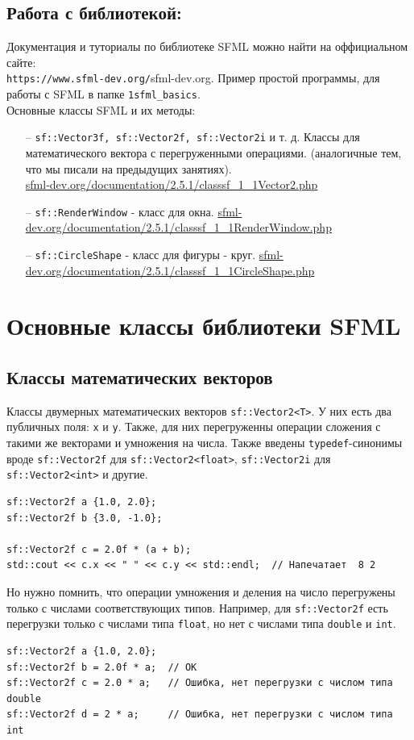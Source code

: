 \documentclass{article}
\begin{document}
\subsection*{Работа с библиотекой:}
Документация и туториалы по библиотеке SFML можно найти на оффициальном сайте:\\ \texttt{https://www.sfml-dev.org/}{sfml-dev.org}. Пример простой программы, для работы с SFML в папке \texttt{1sfml\_basics}. \\
Основные классы SFML и их методы:
\begin{itemize}
\item[--] \texttt{sf::Vector3f, sf::Vector2f, sf::Vector2i} и т. д. Классы для математического вектора с перегруженными операциями. (аналогичные тем, что мы писали на предыдущих занятиях). \\
\href{https://www.sfml-dev.org/documentation/2.5.1/classsf_1_1Vector2.php}{sfml-dev.org/documentation/2.5.1/classsf\_1\_1Vector2.php}
\item[--] \texttt{sf::RenderWindow} - класс для окна.
\href{https://www.sfml-dev.org/documentation/2.5.1/classsf_1_1RenderWindow.php}{sfml-dev.org/documentation/2.5.1/classsf\_1\_1RenderWindow.php}
\item[--] \texttt{sf::CircleShape} - класс для фигуры - круг.
\href{https://www.sfml-dev.org/documentation/2.5.1/classsf_1_1CircleShape.php}{sfml-dev.org/documentation/2.5.1/classsf\_1\_1CircleShape.php}
\end{itemize}
\fi


\newpage
\section{Основные классы библиотеки SFML}

\subsection*{Классы математических векторов}
Классы двумерных математических векторов \texttt{sf::Vector2<T>}. У них есть два публичных поля: \texttt{x} и \texttt{y}. Также, для них перегруженны операции сложения с такими же векторами и умножения на числа. Также введены \texttt{typedef}-синонимы вроде \texttt{sf::Vector2f} для \texttt{sf::Vector2<float>}, \texttt{sf::Vector2i} для \texttt{sf::Vector2<int>} и другие.
\begin{lstlisting}
sf::Vector2f a {1.0, 2.0};
sf::Vector2f b {3.0, -1.0};

sf::Vector2f c = 2.0f * (a + b);
std::cout << c.x << " " << c.y << std::endl;  // Напечатает  8 2
\end{lstlisting}
Но нужно помнить, что операции умножения и деления на число перегружены только с числами соответствующих типов. Например, для \texttt{sf::Vector2f} есть перегрузки только с числами типа \texttt{float}, но нет с числами типа \texttt{double} и \texttt{int}.
\begin{lstlisting}
sf::Vector2f a {1.0, 2.0};
sf::Vector2f b = 2.0f * a;  // ОК
sf::Vector2f c = 2.0 * a;   // Ошибка, нет перегрузки с числом типа double
sf::Vector2f d = 2 * a;     // Ошибка, нет перегрузки с числом типа int
\end{lstlisting}
\end{document}
